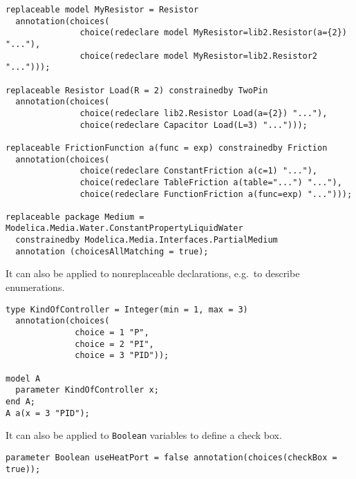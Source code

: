 \begin{example}
\begin{lstlisting}[language=modelica]
replaceable model MyResistor = Resistor
  annotation(choices(
               choice(redeclare model MyResistor=lib2.Resistor(a={2}) "..."),
               choice(redeclare model MyResistor=lib2.Resistor2 "...")));

replaceable Resistor Load(R = 2) constrainedby TwoPin
  annotation(choices(
               choice(redeclare lib2.Resistor Load(a={2}) "..."),
               choice(redeclare Capacitor Load(L=3) "...")));

replaceable FrictionFunction a(func = exp) constrainedby Friction
  annotation(choices(
               choice(redeclare ConstantFriction a(c=1) "..."),
               choice(redeclare TableFriction a(table="...") "..."),
               choice(redeclare FunctionFriction a(func=exp) "...")));

replaceable package Medium = Modelica.Media.Water.ConstantPropertyLiquidWater
  constrainedby Modelica.Media.Interfaces.PartialMedium
  annotation (choicesAllMatching = true);
\end{lstlisting}

It can also be applied to nonreplaceable declarations, e.g.\ to describe enumerations.
\begin{lstlisting}[language=modelica]
type KindOfController = Integer(min = 1, max = 3)
  annotation(choices(
              choice = 1 "P",
              choice = 2 "PI",
              choice = 3 "PID"));

model A
  parameter KindOfController x;
end A;
A a(x = 3 "PID");
\end{lstlisting}

It can also be applied to \lstinline!Boolean! variables to define a check box.
\begin{lstlisting}[language=modelica]
parameter Boolean useHeatPort = false annotation(choices(checkBox = true));
\end{lstlisting}
\end{example}
